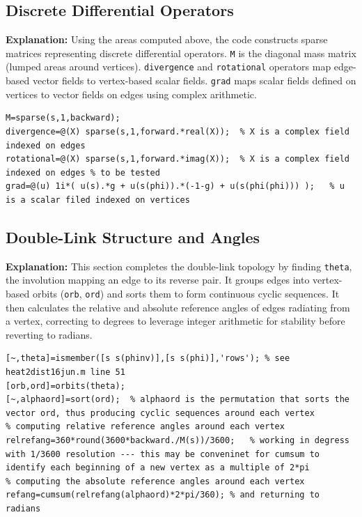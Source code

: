 \subsection{Discrete Differential Operators}
\textbf{Explanation:} Using the areas computed above, the code constructs sparse matrices representing discrete differential operators. \texttt{M} is the diagonal mass matrix (lumped areas around vertices). \texttt{divergence} and \texttt{rotational} operators map edge-based vector fields to vertex-based scalar fields. \texttt{grad} maps scalar fields defined on vertices to vector fields on edges using complex arithmetic.

\begin{lstlisting}[style=matlab]
% The mass matrix, diverg and grad
M=sparse(s,1,backward);
divergence=@(X) sparse(s,1,forward.*real(X));  % X is a complex field indexed on edges 
rotational=@(X) sparse(s,1,forward.*imag(X));  % X is a complex field indexed on edges % to be tested
grad=@(u) 1i*( u(s).*g + u(s(phi)).*(-1-g) + u(s(phi(phi))) );   % u is a scalar filed indexed on vertices 
\end{lstlisting}

\subsection{Double-Link Structure and Angles}
\textbf{Explanation:} This section completes the double-link topology by finding \texttt{theta}, the involution mapping an edge to its reverse pair. It groups edges into vertex-based orbits (\texttt{orb}, \texttt{ord}) and sorts them to form continuous cyclic sequences. It then calculates the relative and absolute reference angles of edges radiating from a vertex, correcting to degrees to leverage integer arithmetic for stability before reverting to radians.

\begin{lstlisting}[style=matlab]
% completing the double-link structure: (theta,phi)
[~,theta]=ismember([s s(phinv)],[s s(phi)],'rows'); % see heat2dist16jun.m line 51
[orb,ord]=orbits(theta);
[~,alphaord]=sort(ord);  % alphaord is the permutation that sorts the vector ord, thus producing cyclic sequences around each vertex
% computing relative reference angles around each vertex
relrefang=360*round(3600*backward./M(s))/3600;   % working in degress with 1/3600 resolution --- this may be conveninet for cumsum to identify each beginning of a new vertex as a multiple of 2*pi
% computing the absolute reference angles around each vertex
refang=cumsum(relrefang(alphaord)*2*pi/360); % and returning to radians
\end{lstlisting}

